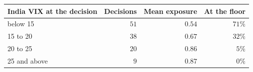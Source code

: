 \begin{tabular}{lrrr}
\toprule
India VIX at the decision & Decisions & Mean exposure & At the floor \\
\midrule
below 15 & $51$ & $0.54$ & $71\%$ \\
15 to 20 & $38$ & $0.67$ & $32\%$ \\
20 to 25 & $20$ & $0.86$ & $5\%$ \\
25 and above & $9$ & $0.87$ & $0\%$ \\
\bottomrule
\end{tabular}
